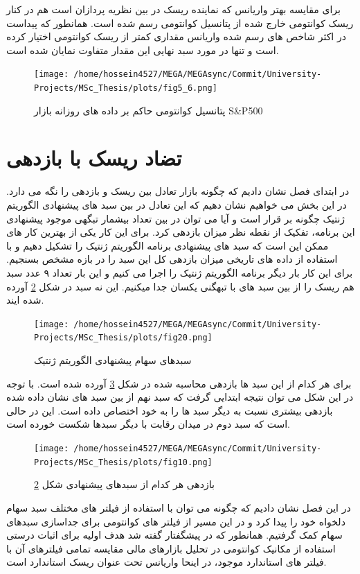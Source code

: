 \documentclass[a4paper,titlepage,12pt,fleqn,oneside]{report}
\begin{document}
برای مقایسه بهتر واریانس که نماینده ریسک در بین نظریه پردازان است هم در کنار ریسک کوانتومی خارج شده از پتانسیل کوانتومی رسم شده است.  همانطور که پیداست در اکثر شاخص های رسم شده واریانس مقداری کمتر از ریسک کوانتومی اختیار کرده است و تنها در مورد سبد نهایی این مقدار متفاوت نمایان شده است. 
 
\begin{figure}[ptb]
	\centering
	\texttt{[image: /home/hossein4527/MEGA/MEGAsync/Commit/University-Projects/MSc\_Thesis/plots/fig5\_6.png]}
	\caption{پتانسیل کوانتومی حاکم بر داده های روزانه بازار S\&P500}
	\label{fig:5.6}
\end{figure}
\section{تضاد ریسک با  بازدهی}
در ابتدای فصل نشان دادیم که چگونه بازار تعادل بین ریسک و بازدهی را نگه می دارد. در این بخش می خواهیم نشان دهیم که این تعادل در بین سبد های پیشنهادی الگوریتم ژنتیک چگونه بر قرار است و آیا می توان در بین تعداد بیشمار تبگهی موجود پیشنهادی این برنامه، تفکیک از نقطه نظر میزان بازدهی کرد. برای این کار یکی از بهترین کار های ممکن این است که سبد های پیشنهادی برنامه الگوریتم ژنتیک را تشکیل دهیم و با استفاده از داده های تاریخی میزان بازدهی کل این سبد را در بازه مشخص بسنجیم. برای این کار بار دیگر برنامه الگوریتم ژنتیک را اجرا می کنیم و این بار تعداد ۹ عدد سبد هم ریسک را از بین سبد های با تبهگنی یکسان جدا میکنیم. این نه سبد در شکل 
\ref{fig:5.7} 
آورده شده ایند.
\begin{figure}[ptb]
	\centering
	\texttt{[image: /home/hossein4527/MEGA/MEGAsync/Commit/University-Projects/MSc\_Thesis/plots/fig20.png]}
	\caption{سبدهای سهام پیشنهادی الگوریتم ژنتیک}
	\label{fig:5.7}
\end{figure}
برای هر کدام از این سبد ها بازدهی محاسبه شده در شکل
\ref{fig:5.8}
آورده شده است. با توجه در این شکل می توان نتیجه ابتدایی گرفت که سبد نهم از بین سبد های نشان داده شده بازدهی بیشتری نسبت به دیگر سبد ها را به خود اختصاص داده است. این در حالی است که سبد دوم در میدان رقابت با دیگر سبدها شکست خورده است. 
\begin{figure}[ptb]
	\centering
	\texttt{[image: /home/hossein4527/MEGA/MEGAsync/Commit/University-Projects/MSc\_Thesis/plots/fig10.png]}
	\caption{بازدهی هر کدام از سبدهای پیشنهادی شکل \ref{fig:5.7}}
	\label{fig:5.8}
\end{figure}
در این فصل نشان دادیم که چگونه می توان با استفاده از فیلتر های مختلف سبد سهام دلخواه خود را پیدا کرد و در این مسیر از فیلتر های کوانتومی برای جداسازی سبدهای سهام کمک گرفتیم. همانطور که در پیشگفتار گفته شد هدف اولیه برای اثبات درستی استفاده از مکانیک کوانتومی در تحلیل بازارهای مالی مقایسه تمامی فیلترهای آن با فیلتر های استاندارد موجود، در اینحا واریانس تحت عنوان ریسک استاندارد است. 
\end{document}
